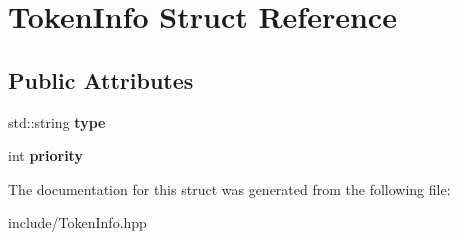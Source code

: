 \hypertarget{structTokenInfo}{}\section{Token\+Info Struct Reference}
\label{structTokenInfo}
\subsection*{Public Attributes}
\begin{DoxyCompactItemize}
\item 
std\+::string {\bfseries type}\hypertarget{structTokenInfo_aa3deb1a4f607bfac7a888901d91915e6}{}\label{structTokenInfo_aa3deb1a4f607bfac7a888901d91915e6}

\item 
int {\bfseries priority}\hypertarget{structTokenInfo_a4165480202ffe6cab52678c7a489b3f9}{}\label{structTokenInfo_a4165480202ffe6cab52678c7a489b3f9}

\end{DoxyCompactItemize}


The documentation for this struct was generated from the following file\+:\begin{DoxyCompactItemize}
\item 
include/Token\+Info.\+hpp\end{DoxyCompactItemize}
